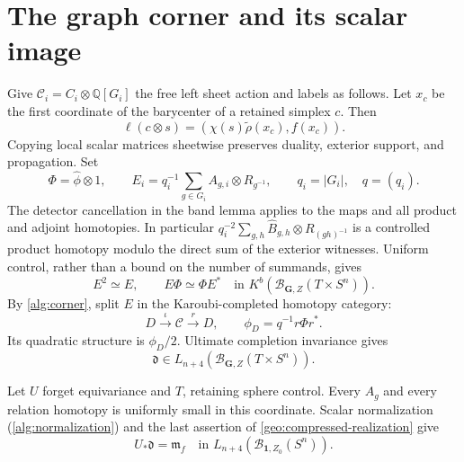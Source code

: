 \documentclass[11pt]{amsart}
\numberwithin{equation}{section}
\theoremstyle{definition}
\theoremstyle{remark}
\newcommand{\Q}{\mathbb Q}
\begin{document}
\section{The graph corner and its scalar image}\label{sec:equivariant}

Give $\mathcal C_i=C_i\otimes\Q[G_i]$ the free left sheet action and
labels as follows. Let $x_c$ be the first coordinate of the barycenter
of a retained simplex $c$. Then
\begin{equation}\label{eq:sheet-labels}
 \ell(c\otimes s)=
 (\chi(s)\widetilde\rho(x_c),f(x_c)).
\end{equation}
Copying local scalar matrices sheetwise preserves duality, exterior
support, and propagation. Set
\begin{equation}\label{eq:graph-idempotent}
 \Phi=\widehat\phi\otimes1,\qquad
 E_i=q_i^{-1}\sum_{g\in G_i}A_{g,i}\otimes R_{g^{-1}},
 \qquad q_i=|G_i|,\quad q=(q_i).
\end{equation}
The detector cancellation in the band lemma applies to the maps and
all product and adjoint homotopies. In particular
$q_i^{-2}\sum_{g,h}\widehat B_{g,h}\otimes R_{(gh)^{-1}}$
is a controlled product homotopy modulo the direct sum of the exterior
witnesses. Uniform control, rather than a bound on the number of
summands, gives
\begin{equation}\label{eq:controlled-idempotent}
 E^2\simeq E,\qquad E\Phi\simeq\Phi E^*
 \quad\text{in }K^b(\mathcal B_{\mathbf G,Z}(T\times S^n)).
\end{equation}
By \cref{alg:corner}, split $E$ in the Karoubi-completed homotopy category:
\begin{equation}\label{eq:normalized-corner}
 D\xrightarrow{\iota}\mathcal C\xrightarrow{r}D,
 \qquad \phi_D=q^{-1}r\Phi r^*.
\end{equation}
Its quadratic structure is $\phi_D/2$. Ultimate completion invariance
gives
\begin{equation}\label{eq:d-class}
 \mathfrak d\in L_{n+4}(\mathcal B_{\mathbf G,Z}(T\times S^n)).
\end{equation}

Let $U$ forget equivariance and $T$, retaining sphere control.
Every $A_g$ and every relation homotopy is uniformly small in this
coordinate. Scalar normalization (\cref{alg:normalization}) and
the last assertion of \cref{geo:compressed-realization} give
\begin{equation}\label{eq:scalar-image}
 U_*\mathfrak d=\mathfrak m_f
 \quad\text{in }L_{n+4}(\mathcal B_{\mathbf1,Z_0}(S^n)).
\end{equation}
\end{document}
